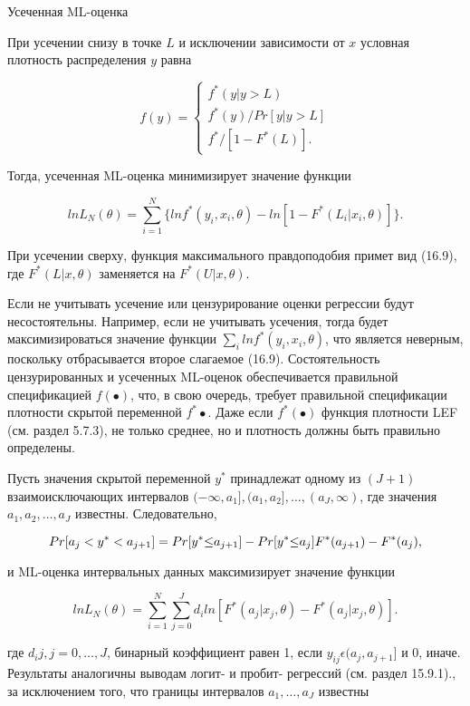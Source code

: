 Усеченная ML-оценка


При усечении снизу в точке $L$ и исключении зависимости от $x$ условная плотность распределения $y$ равна 


\[
f(y)=
\begin{cases}
f^{*}(y|y>L) \\
f^{*}(y)/Pr[y|y>L] \\
f^{*}/[1-F^{*}(L)].
\end{cases}
\]


Тогда, усеченная ML-оценка минимизирует значение функции


\begin{equation}
ln{L_N(\theta)}=\sum_{i=1}^N \lbrace ln{f^{*}(y_i,x_i,\theta)-ln[1-F^{*}(L_i|x_i,\theta)]}\rbrace.
\end{equation}

При усечении сверху, функция максимального правдоподобия примет вид (16.9), где $F^{*}(L|x,\theta)$ заменяется на $F^{*}(U|x,\theta)$.


Если не учитывать усечение или цензурирование оценки регрессии будут несостоятельны. Например, если не учитывать усечения, тогда будет максимизироваться значение функции $\sum_{i} ln{f^{*}(y_i,x_i,\theta)}$, что является неверным, поскольку отбрасывается второе слагаемое (16.9). Состоятельность цензурированных и усеченных ML-оценок обеспечивается правильной спецификацией $f(\bullet)$, что, в свою очередь, требует правильной спецификации плотности скрытой переменной $f^{*}\bullet$. Даже если $f^{*}(\bullet)$ функция плотности LEF (см. раздел 5.7.3), не только среднее, но и плотность должны быть правильно определены.

Пусть значения скрытой переменной $y^{*}$ принадлежат одному из $(J+1)$ взаимоисключающих интервалов $(-\infty,a_1], (a_1,a_2],\ldots ,(a_J,\infty)$, где значения $a_1,a_2,\ldots ,a_J$ известны. Следовательно,

\[
Pr[a_j<y^{*}<a_{j+1}]=Pr[y^{*}{\leq}a_{j+1}]-Pr[y^{*}{\leq}a_j] \\
F^{*}(a_{j+1})-F^{*}(a_j),
\]

и ML-оценка интервальных данных максимизирует значение функции 

\begin{equation}
ln{L_N(\theta)}=\sum_{i=1}^N\sum_{j=0}^J d_i ln[F^{*}(a_j|x_j,\theta)-F^{*}(a_j|x_j,\theta)].
\end{equation}


где $d_ij, j=0,\ldots ,J$, бинарный коэффициент равен 1, если $y_{ij}{\epsilon}(a_j,a_{j+1}]$ и $0$, иначе. Результаты аналогичны выводам логит- и пробит- регрессий (см. раздел 15.9.1)., за исключением того, что границы интервалов $a_1,\ldots ,a_J$ известны


